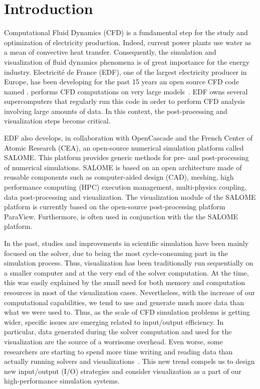 \section{Introduction}
Computational Fluid Dynamics (CFD) is a fundamental step for the study and
optimization of electricity production. Indeed, current power plants use water
as a mean of convective heat transfer. Consequently, the simulation and
visualization of fluid dynamics phenomena is of great importance for the energy
industry. Electricité de France (EDF), one of the largest electricity producer in Europe, has
been developing for the past 15 years an open source CFD code named \CS. \CS performs
CFD computations on very large models~\cite{5644955}. EDF owns
several supercomputers that regularly run this code in order to perform CFD
analysis involving large amounts of data. In this context, the post-processing
and visualization steps become critical. 

EDF also develops, in collaboration with OpenCascade and the French Center of
Atomic Research (CEA), an open-source numerical simulation platform called
SALOME. This platform provides generic methods for pre- and post-processing of
numerical simulations. SALOME is based on an open architecture made of reusable
components such as computer-aided design (CAD),
meshing, high performance computing (HPC) execution management, multi-physics coupling, data post-processing
and visualization. The visualization module of the SALOME platform is currently based
on the open-source post-processing platform ParaView. Furthermore, \CS is often used 
in conjunction with the the SALOME platform.

In the past, studies and improvements in scientific simulation have been mainly
focused on the solver, due to being the most cycle-consuming part in the
simulation process. Thus, visualization has been traditionally run sequentially
on a smaller computer and at the very end of the solver computation. At the
time, this was easily explained by the small need for both memory and
computation resources in most of the visualization cases. Nevertheless, with the
increase of our computational capabilities, we tend to use and generate much
more data than what we were used to. Thus, as the scale of CFD simulation
problems is getting wider, specific issues are emerging related to input/output
efficiency. In particular, data generated during the solver computation and
used for the visualization are the source of a worrisome overhead. Even worse,
some researchers are starting to spend more time writing and reading data
than actually running solvers and visualizations~\cite{1742-6596-125-1-012099}.
This new trend compels us to design new input/output (I/O) strategies and consider
visualization as a part of our high-performance simulation systems.

